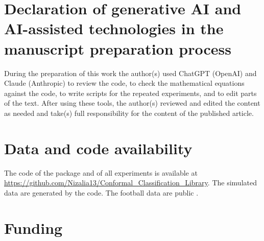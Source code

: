 



\maketitle








\printcredits

\section*{Declaration of generative AI and AI-assisted technologies in the manuscript preparation process}
During the preparation of this work the author(s) used ChatGPT (OpenAI) and Claude (Anthropic) to review the code, to check 
the mathematical equations against the code, to write scripts for the repeated experiments, and to edit parts of the text. 
After using these tools, the author(s) reviewed and edited the content as needed and take(s) full responsibility for the 
content of the published article.

\section*{Data and code availability}
The code of the package and of all experiments is available at 
\url{https://github.com/Nizalia13/Conformal_Classification_Library}. The simulated data are generated by the code. 
The football data are public \citep{fifa19data}.

\section*{Funding}




